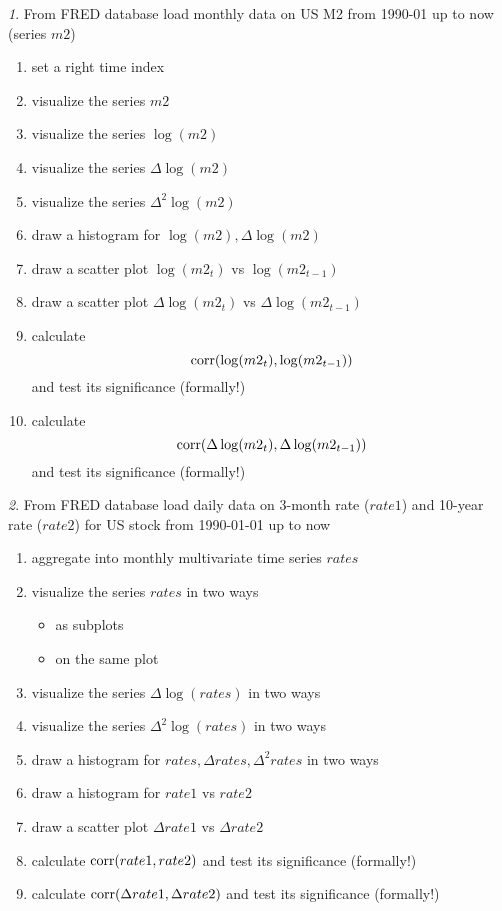 \documentclass[12pt]{article}
\theoremstyle{remark}
\newtheorem{exercise}{}[section]
\begin{document}
\begin{exercise}
From FRED database load monthly data on US M2 from 1990-01 up to now (series \(m2\)) 
\begin{enumerate}
	\item set a right time index
	\item visualize the series \(m2\)
	\item visualize the series \(\log(m2)\)
	\item visualize the series \(\Delta\log(m2)\)
	\item visualize the series \(\Delta^2\log(m2)\)
	\item draw a histogram for \(\log(m2),\Delta\log(m2)\)
	\item draw a scatter plot \(\log(m2_t)\) vs \(\log(m2_{t-1})\)
	\item draw a scatter plot \(\Delta\log(m2_t)\) vs \(\Delta\log(m2_{t-1})\)
	\item calculate \[\operatorname{corr}(\log(m2_t), \log(m2_{t-1}))\] and test its significance (formally!)
	\item calculate \[\operatorname{corr}(\Delta\log(m2_t), \Delta\log(m2_{t-1}))\] and test its significance (formally!)
\end{enumerate}
\end{exercise}

\begin{exercise}
From FRED database load daily data on 3-month rate (\(rate1\)) and 10-year rate (\(rate2\))
for US stock from 1990-01-01 up to now
\begin{enumerate}
	\item aggregate into monthly multivariate time series \(rates\)
	\item visualize the series \(rates\) in two ways
	\begin{itemize}
		\item as subplots
		\item on the same plot
	\end{itemize}
	\item visualize the series \(\Delta\log(rates)\) in two ways
	\item visualize the series \(\Delta^2\log(rates)\) in two ways
	\item draw a histogram for \(rates,\Delta rates,\Delta^2 rates\) in two ways
	\item draw a histogram for \(rate1\) vs \(rate2\)
	\item draw a scatter plot \(\Delta rate1 \) vs \(\Delta rate2\)
	\item calculate \(\operatorname{corr}(rate1, rate2)\) and test its significance (formally!)
	\item calculate \(\operatorname{corr}(\Delta rate1, \Delta rate2)\) and test its significance (formally!)
\end{enumerate}
\end{exercise}
\end{document}

